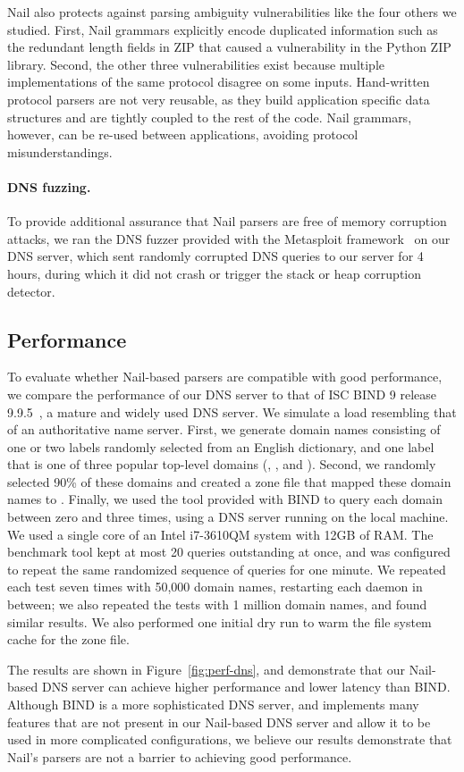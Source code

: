 Nail also protects against parsing ambiguity vulnerabilities like the four others we studied. First,
Nail grammars explicitly encode duplicated information such as the redundant length fields in ZIP
that caused a vulnerability in the Python ZIP library. Second, the other three vulnerabilities exist
because multiple implementations of the same protocol disagree on some inputs. Hand-written protocol
parsers are not very reusable, as they build application specific data structures and are tightly
coupled to the rest of the code. Nail grammars, however, can be re-used between applications,
avoiding protocol misunderstandings.

\paragraph{DNS fuzzing.}

To provide additional assurance that Nail parsers are free of memory
corruption attacks, we ran the DNS fuzzer provided with the Metasploit
framework~\cite{mspframework} on our DNS server, which sent randomly
corrupted DNS queries to our server for 4 hours, during which it did
not crash or trigger the stack or heap corruption detector.


\subsection{Performance}

To evaluate whether Nail-based parsers are compatible with good
performance, we compare the performance of our DNS server to that of ISC
BIND 9 release 9.9.5~\cite{bind9}, a mature and widely used DNS server.
We simulate a load resembling that of an authoritative name server.
First, we generate domain names consisting of one or two labels randomly
selected from an English dictionary, and one label that is one of
three popular top-level domains (, , and ).
Second, we randomly selected 90\% of these domains and created a zone
file that mapped these domain names to .  Finally, we used
the  tool provided with BIND to query each domain between
zero and three times, using a DNS server running on the local machine.
We used a single core of an Intel i7-3610QM system with 12GB of RAM\@.
The benchmark tool kept at most 20 queries outstanding at once, and
was configured to repeat the same randomized sequence of queries for
one minute.  We repeated each test seven times with 50,000 domain names,
restarting each daemon in between; we also repeated the tests with 1
million domain names, and found similar results.  We also performed one
initial dry run to warm the file system cache for the zone file.

The results are shown in Figure~\ref{fig:perf-dns}, and demonstrate that
our Nail-based DNS server can achieve higher performance and lower latency
than BIND\@.  Although BIND is a more sophisticated DNS server,
and implements many features that are not present in our Nail-based DNS
server and allow it to be used in more complicated configurations, 
we believe our results demonstrate that Nail's parsers are not
a barrier to achieving good performance.




